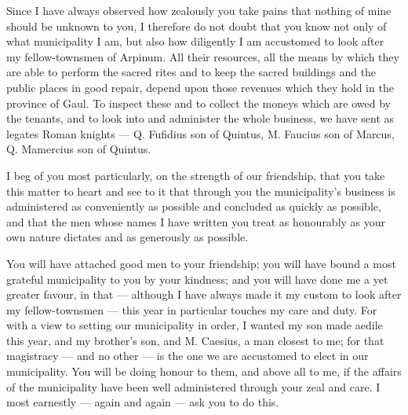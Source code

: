 

 Since I have always observed how zealously you take pains that nothing of mine should be unknown to you, I therefore do not doubt that you know not only of what municipality I am, but also how diligently I am accustomed to look after my fellow-townsmen of Arpinum. All their resources, all the means by which they are able to perform the sacred rites and to keep the sacred buildings and the public places in good repair, depend upon those revenues which they hold in the province of Gaul. To inspect these and to collect the moneys which are owed by the tenants, and to look into and administer the whole business, we have sent as legates Roman knights --- Q. Fufidius son of Quintus, M. Faucius son of Marcus, Q. Mamercius son of Quintus.

 I beg of you most particularly, on the strength of our friendship, that you take this matter to heart and see to it that through you the municipality's business is administered as conveniently as possible and concluded as quickly as possible, and that the men whose names I have written you treat as honourably as your own nature dictates and as generously as possible.

 You will have attached good men to your friendship; you will have bound a most grateful municipality to you by your kindness; and you will have done me a yet greater favour, in that --- although I have always made it my custom to look after my fellow-townsmen --- this year in particular touches my care and duty. For with a view to setting our municipality in order, I wanted my son made aedile this year, and my brother's son, and M. Caesius, a man closest to me; for that magistracy --- and no other --- is the one we are accustomed to elect in our municipality. You will be doing honour to them, and above all to me, if the affairs of the municipality have been well administered through your zeal and care. I most earnestly --- again and again --- ask you to do this.

